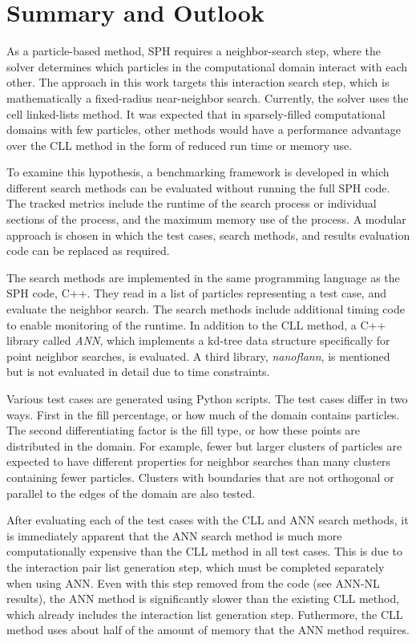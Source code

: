 
\chapter{Summary and Outlook}

As a particle-based method, SPH requires a neighbor-search step, where the solver determines which particles in the computational domain interact with each other. The approach in this work targets this interaction search step, which is mathematically a fixed-radius near-neighbor search. Currently, the solver uses the cell linked-lists method. It was expected that in sparsely-filled computational domains with few particles, other methods would have a performance advantage over the CLL method in the form of reduced run time or memory use.

To examine this hypothesis, a benchmarking framework is developed in which different search methods can be evaluated without running the full SPH code. The tracked metrics include the runtime of the search process or individual sections of the process, and the maximum memory use of the process. A modular approach is chosen in which the test cases, search methods, and results evaluation code can be replaced as required. 

The search methods are implemented in the same programming language as the SPH code, C++. They read in a list of particles representing a test case, and evaluate the neighbor search. The search methods include additional timing code to enable monitoring of the runtime. In addition to the CLL method, a C++ library called {\itshape ANN}, which implements a kd-tree data structure specifically for point neighbor searches, is evaluated. A third library, {\itshape nanoflann}, is mentioned but is not evaluated in detail due to time constraints.

Various test cases are generated using Python scripts. The test cases differ in two ways. First in the fill percentage, or how much of the domain contains particles. The second differentiating factor is the fill type, or how these points are distributed in the domain. For example, fewer but larger clusters of particles are expected to have different properties for neighbor searches than many clusters containing fewer particles. Clusters with boundaries that are not orthogonal or parallel to the edges of the domain are also tested.

After evaluating each of the test cases with the CLL and ANN search methods, it is immediately apparent that the ANN search method is much more computationally expensive than the CLL method in all test cases. This is due to the interaction pair list generation step, which must be completed separately when using ANN. Even with this step removed from the code (see ANN-NL results), the ANN method is significantly slower than the existing CLL method, which already includes the interaction list generation step. Futhermore, the CLL method uses about half of the amount of memory that the ANN method requires.

